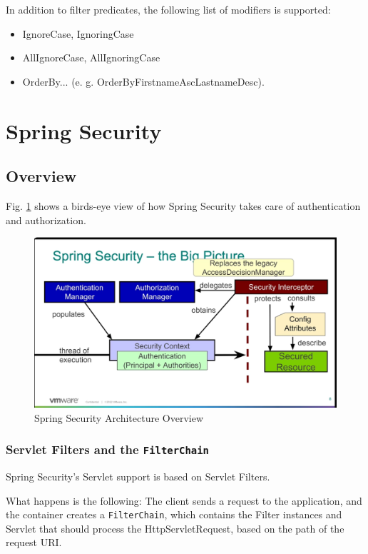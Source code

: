 \documentclass{scrartcl}
\begin{document}
    In addition to filter predicates, the following list of modifiers is supported:
    \begin{itemize}
        \item IgnoreCase, IgnoringCase
        \item AllIgnoreCase, AllIgnoringCase
        \item OrderBy... (e. g. OrderByFirstnameAscLastnameDesc).
    \end{itemize}




\section{Spring Security}
\subsection{Overview}

Fig. \ref*{fig:spring-security} shows a birds-eye view of how Spring Security takes care of authentication and authorization.

\begin{figure}[h!]
    \centering
    \includegraphics[width=1\linewidth]{spring-security}
    \caption{Spring Security Architecture Overview}
    \label{fig:spring-security}
\end{figure}

\subsubsection{Servlet Filters and the \lstinline|FilterChain|}

Spring Security’s Servlet support is based on Servlet Filters.

What happens is the following: The client sends a request to the application, and the container creates a \lstinline|FilterChain|, which contains the Filter instances and Servlet that should process the HttpServletRequest, based on the path of the request URI.
\end{document}
